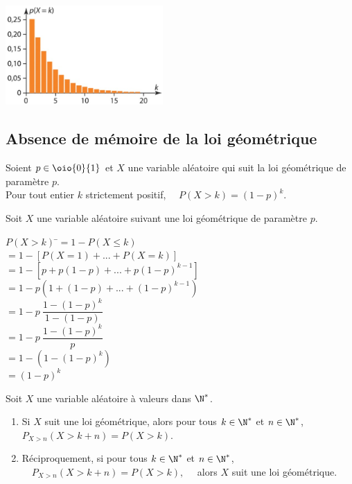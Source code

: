 \documentclass[a4paper,11pt,cours]{nsi} %
\begin{document}
{\includegraphics[width=6cm]{diagramme_geom.jpg}}

\subsection*{Absence de mémoire de la loi géométrique}
\begin{propriete}[]
    Soient $p\in\oio{0}{1}$ et $X$ une variable aléatoire qui suit la loi géométrique de paramètre $p$.\\
    Pour tout entier $k$ strictement positif, $\quad P(X>k)=(1-p)^k$.
\end{propriete}

\begin{demonstration}
    Soit $X$ une variable aléatoire suivant une loi géométrique de paramètre $p$.
    \begin{tabbing}
        $P(X>k)$    \=$=1-P(X\leqslant k)$\\[.5em]
        \>  $=1-\left[P(X=1)+...+P(X=k)\right]$\\[.5em]
        \>  $=1-\left[p+p(1-p)+...+p(1-p)^{k-1}\right]$\\[.5em]
        \>  $=1-p\left(1+(1-p)+...+(1-p)^{k-1}\right)$\\[.5em]
        \>  $=1-p\ \dfrac{1-(1-p)^k}{1-(1-p)}$\\[.5em]
        \>  $=1-p\ \dfrac{1-(1-p)^k}{p}$\\[.5em]
        \>  $=1-\left(1-(1-p)^k\right)$\\[.5em]
        \>  $=(1-p)^k$
    \end{tabbing}
\end{demonstration}

\begin{propriete}[]
    Soit $X$ une variable aléatoire à valeurs dans $\N^*$.
    \begin{enumerate}[label=\textbullet]
        \item Si $X$ suit une loi géométrique, alors pour tous $k\in\N^*$ et $n\in\N^*$,\\ $P_{X>n}(X>k+n)=P(X>k)$.
        \item Réciproquement, si pour tous $k\in\N^*$ et $n\in\N^*$, $\quad P_{X>n}(X>k+n)=P(X>k), \quad$ alors $X$ suit une loi géométrique.
    \end{enumerate}
\end{propriete}
\end{document}
